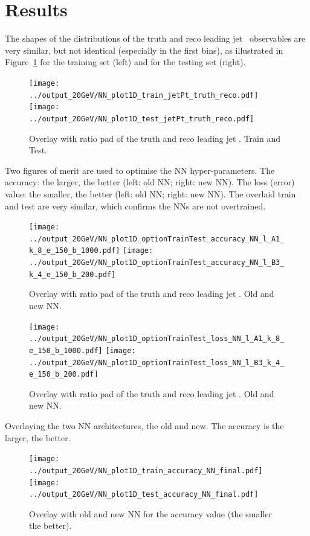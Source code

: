 \section{Results}
\label{sec:Results}

The shapes of the distributions of the truth and reco leading jet \pt~observables are very similar, but not identical (especially in the first bins), as illustrated in Figure~\ref{fig:jetPt} for the training set (left) and for the testing set (right).

\begin{figure}[h]
  \centering
  \texttt{[image: ../output\_20GeV/NN\_plot1D\_train\_jetPt\_truth\_reco.pdf]}
  \texttt{[image: ../output\_20GeV/NN\_plot1D\_test\_jetPt\_truth\_reco.pdf]}
  \caption{Overlay with ratio pad of the truth and reco leading jet \pt. Train and Test.}
  \label{fig:jetPt}
\end{figure}

Two figures of merit are used to optimise the NN hyper-parameters. The accuracy: the larger, the better (left: old NN; right: new NN). The loss (error) value: the smaller, the better (left: old NN; right: new NN). The overlaid train and test are very similar, which confirms the NNs are not overtrained.

\begin{figure}[h]
  \centering
  \texttt{[image: ../output\_20GeV/NN\_plot1D\_optionTrainTest\_accuracy\_NN\_l\_A1\_k\_8\_e\_150\_b\_1000.pdf]}
  \texttt{[image: ../output\_20GeV/NN\_plot1D\_optionTrainTest\_accuracy\_NN\_l\_B3\_k\_4\_e\_150\_b\_200.pdf]}
  \caption{Overlay with ratio pad of the truth and reco leading jet \pt. Old and new NN.}
  \label{fig:accuracyTrainTest}
\end{figure}

\begin{figure}[h]
  \centering
  \texttt{[image: ../output\_20GeV/NN\_plot1D\_optionTrainTest\_loss\_NN\_l\_A1\_k\_8\_e\_150\_b\_1000.pdf]}
  \texttt{[image: ../output\_20GeV/NN\_plot1D\_optionTrainTest\_loss\_NN\_l\_B3\_k\_4\_e\_150\_b\_200.pdf]}
  \caption{Overlay with ratio pad of the truth and reco leading jet \pt. Old and new NN.}
  \label{fig:lossTrainTest}
\end{figure}

Overlaying the two NN architectures, the old and new. The accuracy is the larger, the better.

\begin{figure}[h]
  \centering
  \texttt{[image: ../output\_20GeV/NN\_plot1D\_train\_accuracy\_NN\_final.pdf]}
  \texttt{[image: ../output\_20GeV/NN\_plot1D\_test\_accuracy\_NN\_final.pdf]}
  \caption{Overlay with old and new NN for the accuracy value (the smaller the better).}
  \label{fig:accuracyOldNew}
\end{figure}

